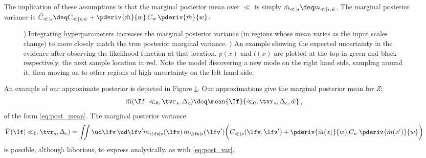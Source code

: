 \documentclass{article} %
\begin{document}
The implication of these assumptions is that the marginal posterior mean over $\ll$ is simply
$
\tilde{m}_{\ll|s} \deq m_{\ll|s,\hat{w}}
$.   
The marginal posterior variance is 
$
\tilde{C}_{\ll|s} 
\deq C_{\ll|s,\hat{w}}
+ 
\pderiv{\hat{m}}{w}
\,C_w\,
\pderiv{\hat{m}}{w}\,.
$
%
\begin{figure}
	\begin{subfigure}[b]{6cm}
		\caption{}
		\label{fig:integrate_hypers}
	\end{subfigure}
\hspace{-1cm}
	\begin{subfigure}[b]{8cm}
		\caption{}
		 \label{fig:eue}
	\end{subfigure}
\caption{) Integrating hyperparameters increases the marginal posterior variance (in regions whose mean varies as the input scales change) to more closely match the true posterior marginal variance. ) An example showing the expected uncertainty in the evidence after observing the likelihood function at that location. $p(x)$ and $l(x)$ are plotted at the top in green and black respectively, the next sample location in red.  Note the model discovering a new mode on the right hand side, sampling around it, then moving on to other regions of high uncertainty on the left hand side. }
\end{figure}
%
%
An example of our approximate posterior is depicted in Figure  \ref{fig:integrate_hypers}.
Our approximations give the marginal posterior mean for $Z$:
\begin{equation}
\tilde{m}(\If|\ll_0,\tvr_s,\Delta_c) \deq \mean{\If}{\ll_0,\tvr_s,\Delta_c, \hat{w}}\,,
\end{equation}
of the form \eqref{eq:post_mean}. The marginal posterior variance
\begin{align}
\tilde{V}(\If|\ll_0,\tvr_s,\Delta_c)=
\iint\ud \lfv\, \ud\lfv' m_{\lfn|s}(\lfv)\, m_{\lfn|s}(\lfv') 
\biggl(C_{\ll|s}(\lfv,\lfv') + 
\pderiv{\hat{m}(x)}{w}
\,C_w\,
\pderiv{\hat{m}(x')}{w}
\biggr)
\end{align}
is possible, although laborious, to express analytically, as with \eqref{eq:post_var}. 

\end{document}
